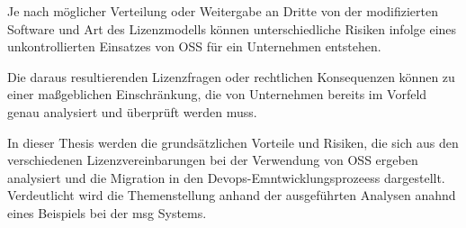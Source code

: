 Je nach möglicher Verteilung oder Weitergabe an Dritte von der modifizierten Software und Art des Lizenzmodells können unterschiedliche Risiken infolge eines unkontrollierten Einsatzes von OSS für ein Unternehmen entstehen.

Die daraus resultierenden Lizenzfragen oder rechtlichen Konsequenzen können zu einer maßgeblichen Einschränkung, die von Unternehmen bereits im Vorfeld genau analysiert und überprüft werden muss.  

In dieser Thesis werden die grundsätzlichen Vorteile und Risiken, die sich aus den verschiedenen Lizenzvereinbarungen bei der Verwendung von OSS ergeben analysiert und die Migration in den Devops-Emntwicklungsprozeess dargestellt.
Verdeutlicht wird die Themenstellung anhand der ausgeführten Analysen anahnd eines Beispiels bei der msg Systems.

